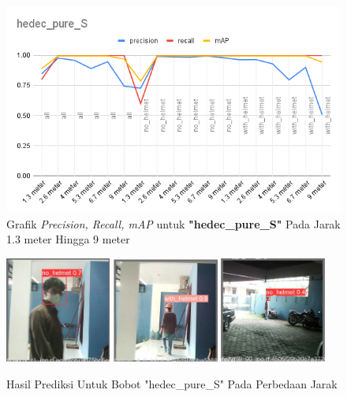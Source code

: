 \begin{enumerate}
  \begin{figure} [h!]
    \centering
    \includegraphics[width=1\textwidth]{gambar/BerdasarkanJarak/hedec_pure_S.png}
    \caption{Grafik \emph{Precision, Recall, mAP} untuk \textbf{"hedec\_pure\_S"} Pada Jarak 1.3 meter Hingga 9 meter}
    \label{fig:grafvaljarak_hedec_pure_S}  
  \end{figure}

  \begin{figure} [h!]
    \centering
    \includegraphics[width=0.31\textwidth]{gambar/BerdasarkanJarak_v2/val_hedec_pure_S/Jarak1_3/val_batch0_pred.jpg}
    \includegraphics[width=0.31\textwidth]{gambar/BerdasarkanJarak_v2/val_hedec_pure_S/Jarak5_3/val_batch0_pred.jpg}
    \includegraphics[width=0.31\textwidth]{gambar/BerdasarkanJarak_v2/val_hedec_pure_S/Jarak9/val_batch0_pred.jpg}
    \caption{Hasil Prediksi Untuk Bobot "hedec\_pure\_S" Pada Perbedaan Jarak}
    \label{fig:valjarak_sample_hedec_pure_S}  
  \end{figure}


\end{enumerate}
